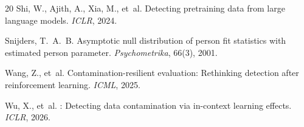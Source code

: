 \documentclass[11pt,a4paper]{article}
\begin{document}
\begin{thebibliography}{20}
Shi, W., Ajith, A., Xia, M., et~al.
\newblock Detecting pretraining data from large language models.
\newblock \emph{ICLR}, 2024.

Snijders, T.~A.~B.
\newblock Asymptotic null distribution of person fit statistics with estimated person parameter.
\newblock \emph{Psychometrika}, 66(3), 2001.

Wang, Z., et~al.
\newblock Contamination-resilient evaluation: Rethinking detection after reinforcement learning.
\newblock \emph{ICML}, 2025.

Wu, X., et~al.
: Detecting data contamination via in-context learning effects.
\newblock \emph{ICLR}, 2026.

\end{thebibliography}
\end{document}
